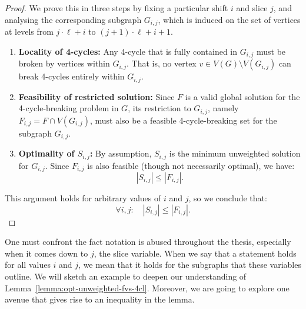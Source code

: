 \begin{proof}
    We prove this in three steps by fixing a particular shift \( i \) and slice \( j \), 
    and analysing the corresponding subgraph \( G_{i,j} \), which is induced on the set of vertices 
    at levels from \( j \cdot \ell + i \) to \( (j + 1) \cdot \ell + i + 1 \).

    \begin{enumerate}
        \item \textbf{Locality of 4-cycles:}  
        Any 4-cycle that is fully contained in \( G_{i,j} \) must be broken by vertices within \( G_{i,j} \).  
        That is, no vertex \( v \in V(G) \setminus V(G_{i,j}) \) can break 4-cycles entirely within \( G_{i,j} \).

        \item \textbf{Feasibility of restricted solution:}  
        Since \( F \) is a valid global solution for the 4-cycle-breaking problem in \( G \),  
        its restriction to \( G_{i,j} \), namely \( F_{i,j} = F \cap V(G_{i,j}) \),  
        must also be a feasible 4-cycle-breaking set for the subgraph \( G_{i,j} \).

        \item \textbf{Optimality of \( S_{i,j} \):}  
        By assumption, \( S_{i,j} \) is the minimum unweighted solution for \( G_{i,j} \).  
        Since \( F_{i,j} \) is also feasible (though not necessarily optimal), we have:
        \[
        |S_{i,j}| \leq |F_{i,j}|\text{.}
        \]
    \end{enumerate}

    This argument holds for arbitrary values of \( i \) and \( j \), so we conclude that:
    \[
    \forall i, j: \quad |S_{i,j}| \leq |F_{i,j}|\text{.}
    \]

\end{proof}

One must confront the fact notation is abused throughout the thesis, especially when it 
comes down to $j$, the slice variable. When we say that a statement holds for all values $i$ and
$j$, we mean that it holds for the subgraphs that these variables outline. We will sketch an example 
to deepen our understanding of Lemma~\ref{lemma:opt-unweighted-fvs-4cl}. Moreover, we are going to explore one avenue 
that gives rise to an inequality in the lemma.

